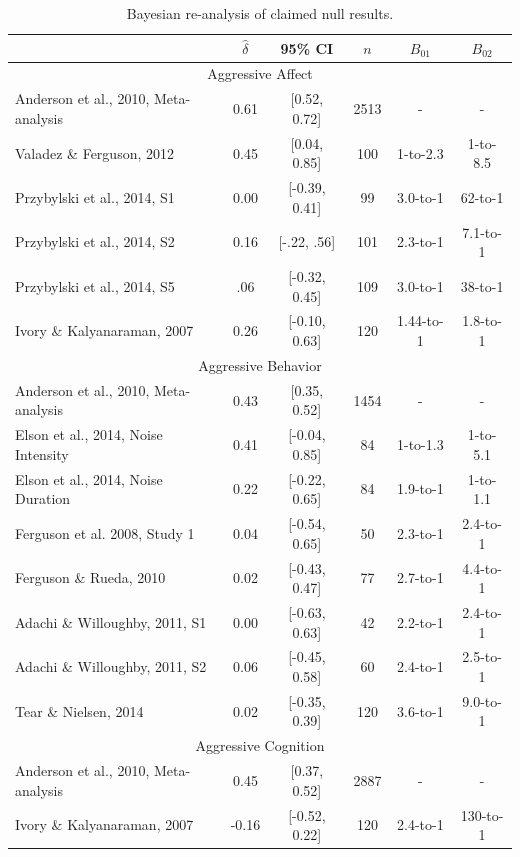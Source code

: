 \documentclass[man]{apa6}
\begin{document}
\begin{table}
\caption{Bayesian re-analysis of claimed null results.}
\begin{tabular}{lccccc}
&$\hat{\delta}$   &95\% CI&$n$  &$B_{01}$ & $B_{02}$ \\ \hline
\multicolumn{6}{c}{Aggressive Affect}\\
Anderson et al., 2010, Meta-analysis&0.61&[0.52, 0.72]&2513&-&- \\
\hspace{.2in} Valadez \& Ferguson, 2012&0.45&[0.04, 0.85]&100&1-to-2.3&1-to-8.5 \\
\hspace{.2in} Przybylski et al., 2014, S1&0.00&[-0.39, 0.41]&99&3.0-to-1&62-to-1 \\
\hspace{.2in} Przybylski et al., 2014, S2&0.16&[-.22, .56]&101&2.3-to-1&7.1-to-1 \\
\hspace{.2in} Przybylski et al., 2014, S5&.06&[-0.32, 0.45]&109&3.0-to-1&38-to-1 \\
\hspace{.2in} Ivory \& Kalyanaraman, 2007&0.26&[-0.10, 0.63]&120&1.44-to-1&1.8-to-1 \\
\multicolumn{6}{c}{Aggressive Behavior}\\
Anderson et al., 2010, Meta-analysis&0.43&[0.35, 0.52]&1454&-&- \\
\hspace{.2in} Elson et al., 2014, Noise Intensity&0.41&[-0.04, 0.85]&84&1-to-1.3&1-to-5.1 \\
\hspace{.2in} Elson et al., 2014, Noise Duration&0.22&[-0.22, 0.65]&84&1.9-to-1&1-to-1.1 \\
\hspace{.2in} Ferguson et al. 2008, Study 1 &0.04&[-0.54, 0.65]&50&2.3-to-1&2.4-to-1 \\
\hspace{.2in} Ferguson \& Rueda, 2010 &0.02&[-0.43, 0.47]&77&2.7-to-1&4.4-to-1 \\
\hspace{.2in} Adachi \& Willoughby, 2011, S1&0.00&[-0.63, 0.63]&42&2.2-to-1&2.4-to-1 \\
\hspace{.2in} Adachi \& Willoughby, 2011, S2&0.06&[-0.45, 0.58]&60&2.4-to-1&2.5-to-1 \\
\hspace{.2in} Tear \& Nielsen, 2014 &0.02&[-0.35, 0.39]&120&3.6-to-1&9.0-to-1 \\
\multicolumn{6}{c}{Aggressive Cognition}\\
Anderson et al., 2010, Meta-analysis&0.45&[0.37, 0.52]&2887&-&- \\
\hspace{.2in} Ivory \& Kalyanaraman, 2007&-0.16&[-0.52, 0.22]&120&2.4-to-1&130-to-1 \\ \hline
\end{tabular}


\end{table}
\end{document}
